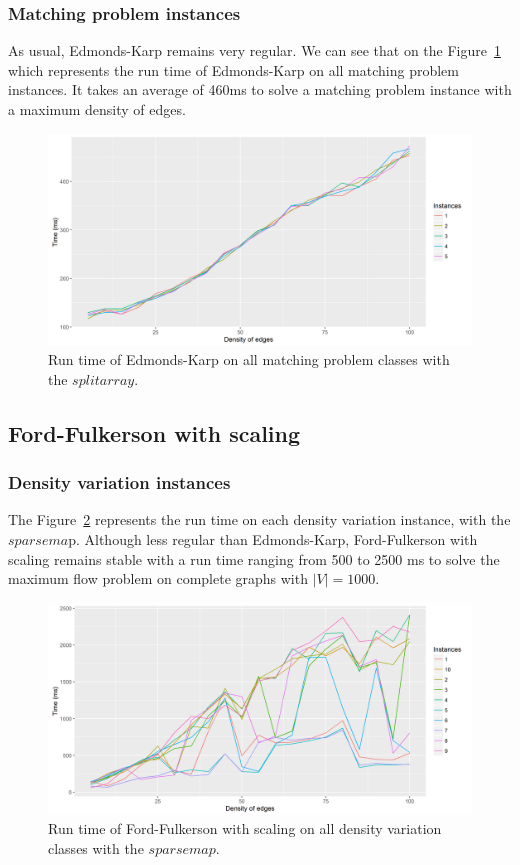 \subsubsection{Matching problem instances}
As usual, Edmonds-Karp remains very regular. We can see that on the Figure~\ref{fig:ekmatching} which represents the run time of Edmonds-Karp on all matching problem instances. It takes an average of 460ms to solve a matching problem instance with a maximum density of edges.
\begin{figure}[H]
\begin{center}
\includegraphics[scale=0.55]{images/results/ekmatching.png}
\caption{Run time of Edmonds-Karp on all matching problem classes with the $split array$.}
\label{fig:ekmatching}
\end{center}
\end{figure}


\subsection{Ford-Fulkerson with scaling}
\subsubsection{Density variation instances}
The Figure~\ref{fig:FFmean} represents the run time on each density variation instance, with the $sparsema$p. Although less regular than Edmonds-Karp, Ford-Fulkerson with scaling remains stable with a run time ranging from 500 to 2500 ms to solve the maximum flow problem on complete graphs with $|V|=1000$.
\begin{figure}[H]
\begin{center}
\includegraphics[scale=0.5]{images/results/FFmean.png}
\caption{Run time of Ford-Fulkerson with scaling on all density variation classes with the $sparse map$.}
\label{fig:FFmean}
\end{center}
\end{figure}


